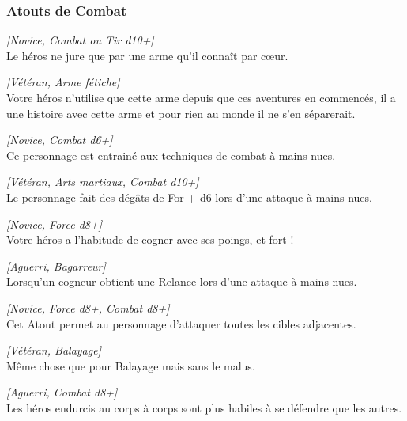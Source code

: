 \subsubsection{Atouts de Combat}
\begin{description}[align=left]
    \item [Arme fétiche]
    	\emph{[Novice, Combat ou Tir d10+]}\\
        Le héros ne jure que par une arme qu’il connaît par c\oe{ur}.

    \item [Arme fétiche adorée]
    	\emph{[Vétéran, Arme fétiche]}\\
        Votre héros n'utilise que cette arme depuis que ces aventures en commencés, il a une histoire avec cette arme et pour rien au monde il ne s'en séparerait.

    \item [Arts martiaux]
    	\emph{[Novice, Combat d6+]}\\
        Ce personnage est entrainé aux techniques de combat à mains nues.

    \item [Maître des arts martiaux]
    	\emph{[Vétéran, Arts martiaux, Combat d10+]}\\
        Le personnage fait des dégâts de For + d6 lors d’une attaque à mains nues.

    \item [Bagarreur]
    	\emph{[Novice, Force d8+]}\\
        Votre héros a l’habitude de cogner avec ses poings, et fort !

    \item [Cogneur]
    	\emph{[Aguerri, Bagarreur]}\\
        Lorsqu’un cogneur obtient une Relance lors d’une attaque à mains nues.

    \item [Balayage]
    	\emph{[Novice, Force d8+, Combat d8+]}\\
        Cet Atout permet au personnage d’attaquer toutes les cibles adjacentes.

    \item [Grand balayage]
    	\emph{[Vétéran, Balayage]}\\
        Même chose que pour Balayage mais sans le malus.

    \item [Blocage]
    	\emph{[Aguerri, Combat d8+]}\\
        Les héros endurcis au corps à corps sont plus habiles à se défendre que les autres.


\end{description}
